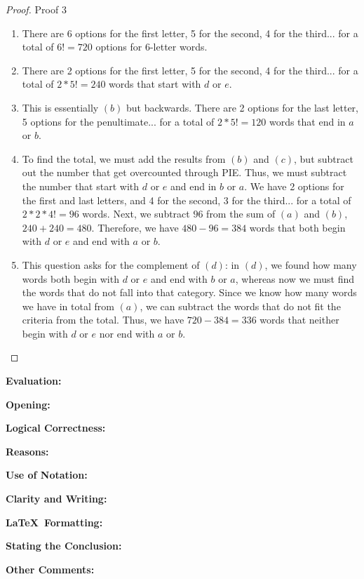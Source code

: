 \documentclass[11pt,titlepage]{article}		%
\def\rubric{\textbf{Evaluation:} \makebox[0.75in]{\hrulefill}

\vspace{.3in}

\textbf{Opening:} \makebox[0.75in]{\hrulefill}

\vspace{.3in}

\textbf{Logical Correctness:} \makebox[0.75in]{\hrulefill}

\vspace{.3in}

\textbf{Reasons:} \makebox[0.75in]{\hrulefill}

\vspace{.3in}

\textbf{Use of Notation:} \makebox[0.75in]{\hrulefill}

\vspace{.3in}

\textbf{Clarity and Writing:} \makebox[0.75in]{\hrulefill}

\vspace{.3in}

\textbf{\LaTeX\ Formatting:} \makebox[0.75in]{\hrulefill}

\vspace{.3in}

\textbf{Stating the Conclusion:} \makebox[0.75in]{\hrulefill}

\vspace{.3in}

\textbf{Other Comments:}

\vspace{1in}

}
\theoremstyle{theorem}
\begin{document}
\begin{proof}
Proof 3
\begin{enumerate}[label=(\alph*)]
\item There are 6 options for the first letter, 5 for the second, 4 for the third... for a total of $6! = 720$ options for 6-letter words.
\item There are 2 options for the first letter, 5 for the second, 4 for the third... for a total of $2*5! = 240$ words that start with $d$ or $e$.
\item This is essentially $(b)$ but backwards. There are 2 options for the last letter, 5 options for the penultimate... for a total of $2*5!=120$ words that end in $a$ or $b$.
\item To find the total, we must add the results from $(b)$ and $(c)$, but subtract out the number that get overcounted through PIE. Thus, we must subtract the number that start with $d$ or $e$ and end in $b$ or $a$. We have 2 options for the first and last letters, and 4 for the second, 3 for the third... for a total of $2*2*4! = 96$ words. Next, we subtract $96$ from the sum of $(a)$ and $(b)$, $240 + 240 = 480$. Therefore, we have $480 - 96 = 384$ words that both begin with $d$ or $e$ and end with $a$ or $b$.
\item This question asks for the complement of $(d)$: in $(d)$, we found how many words both begin with $d$ or $e$ and end with $b$ or $a$, whereas now we must find the words that do not fall into that category. Since we know how many words we have in total from $(a)$, we can subtract the words that do not fit the criteria from the total. Thus, we have $720 - 384 = 336$ words that neither begin with $d$ or $e$ nor end with $a$ or $b$.
\end{enumerate}
\end{proof}

\clearpage
\rubric
\end{document}
